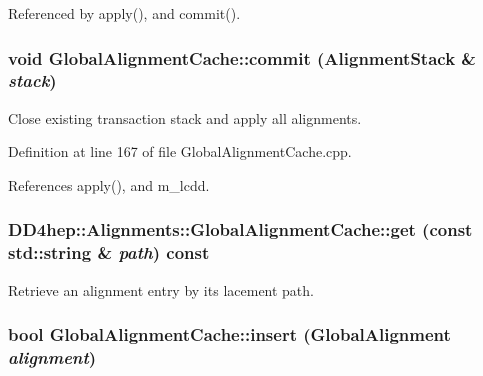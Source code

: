 Referenced by apply(), and commit().\hypertarget{class_d_d4hep_1_1_alignments_1_1_global_alignment_cache_a883c1f7d0e7687caab250c4de0ed59af}{
\subsubsection[{commit}]{\setlength{\rightskip}{0pt plus 5cm}void GlobalAlignmentCache::commit ({\bf AlignmentStack} \& {\em stack})}}
\label{class_d_d4hep_1_1_alignments_1_1_global_alignment_cache_a883c1f7d0e7687caab250c4de0ed59af}


Close existing transaction stack and apply all alignments. 

Definition at line 167 of file GlobalAlignmentCache.cpp.

References apply(), and m\_\-lcdd.\hypertarget{class_d_d4hep_1_1_alignments_1_1_global_alignment_cache_a0247dfc6d79fe30bdf7d133c72fe7149}{
\subsubsection[{get}]{ DD4hep::Alignments::GlobalAlignmentCache::get (const std::string \& {\em path}) const}}
\label{class_d_d4hep_1_1_alignments_1_1_global_alignment_cache_a0247dfc6d79fe30bdf7d133c72fe7149}


Retrieve an alignment entry by its lacement path. \hypertarget{class_d_d4hep_1_1_alignments_1_1_global_alignment_cache_a023ee1b04bc17e8be3a8225f79316daf}{
\subsubsection[{insert}]{\setlength{\rightskip}{0pt plus 5cm}bool GlobalAlignmentCache::insert ({\bf GlobalAlignment} {\em alignment})}}
\label{class_d_d4hep_1_1_alignments_1_1_global_alignment_cache_a023ee1b04bc17e8be3a8225f79316daf}


